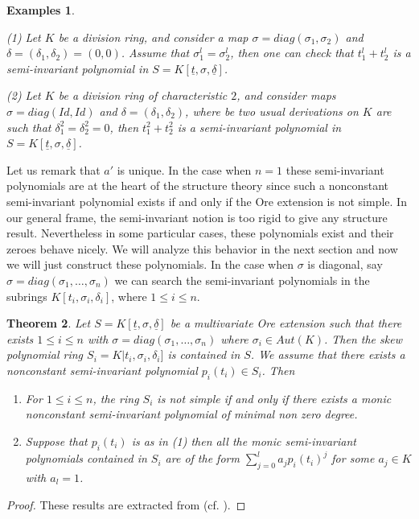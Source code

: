 \documentclass[12pt,a4paper]{article}
\newtheorem{theorem}{Theorem}[section]
\newtheorem{examples}[theorem]{Examples}
\newcommand{\ut}{\underline{t}}
\newcommand{\ud}{\underline{\delta}}
\begin{document}
	\begin{examples} \label{example for semi-invariant polyomial}
		{\rm 
			(1)  Let $K$ be a division ring, and consider a map $\sigma=diag(\sigma_1,\sigma_2)$ and $\delta=(\delta_1,\delta_2)=(0,0)$.   Assume that $\sigma_1^l=\sigma_2^l$, then one can check that $t_1^l+t_2^l$ is a semi-invariant polynomial in $S=K[\ut,\sigma,\ud]$.
			
			(2) Let $K$ be a division ring of characteristic $2$, and consider maps $\sigma=diag(Id,Id)$ and $\delta=(\delta_1,\delta_2)$, where be two usual derivations on $K$ are such that $\delta_1^2=\delta_2^2=0$, then $t_1^2+t_2^2$ is a semi-invariant polynomial in $S=K[\ut,\sigma,\ud]$. 
		}
	\end{examples}
	
	
	
	
	Let us remark that $a'$ is unique.  
	In the case when $n=1$ these semi-invariant polynomials are at the heart of the structure theory since such a nonconstant semi-invariant polynomial exists if and only if the Ore extension is not simple.
	In our general frame, the semi-invariant notion is too rigid to give any structure result.  Nevertheless in some particular cases, these polynomials exist and their zeroes behave nicely.  We will analyze this behavior in the next section and now we will just construct these polynomials.  
	In the case when $\sigma$ is diagonal, say $\sigma = diag (\sigma_1,\dots, \sigma_n)$
	we can search the semi-invariant polynomials in the subrings $K[t_i,\sigma_i, \delta_i]$, where $1\le i \le n$. 
	
	\vspace{3mm} 
	\begin{theorem}\label{Th multivariate Ore extension}
		Let $S=K[\ut,\sigma,\ud]$ be a multivariate Ore extension such that there exists $1\le i \le n$ with $\sigma=diag (\sigma_1,\dots, \sigma_n)$ where $\sigma_i\in Aut(K)$.  Then the skew polynomial ring $S_i=K|t_i,\sigma_i,\delta_i]$ is contained in $S$.
		We assume that there exists a nonconstant semi-invariant polynomial $p_i(t_i)\in S_i$.  Then 
		\begin{enumerate}
			\item For $1\le i \le n$, the ring $S_i$ is not simple if and only if there exists a monic nonconstant semi-invariant polynomial of minimal non zero degree.
			\item Suppose that $p_i(t_i)$ is as in (1) then all the monic semi-invariant polynomials contained in $S_i$ are of the form $\sum_{j=0}^l a_jp_i(t_i)^j$ for some $a_j \in K$ with $a_l=1$.   
		\end{enumerate}
	\end{theorem}
	\begin{proof}
		These results are extracted from (cf. \cite{LM}).
	\end{proof}
	
\end{document}
